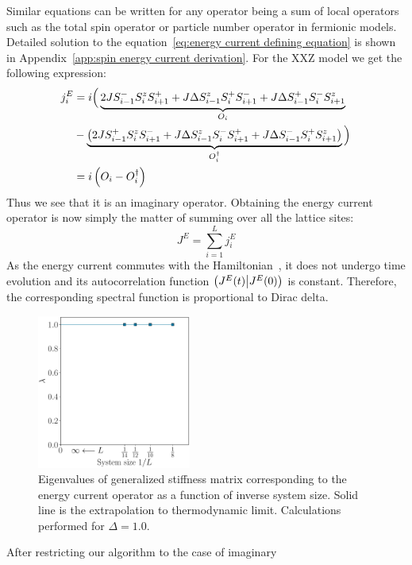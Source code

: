 Similar equations can be written for any operator being a sum of local operators such as
the total spin operator or particle number operator in fermionic models. Detailed solution to the equation~\eqref{eq:energy current defining equation}
is shown in Appendix~\ref{app:spin energy current derivation}. For the XXZ model we get the following expression:
\begin{align*}
  j_i^E & = i \Big( \underbrace{2J S^{-}_{i-1}S^{z}_i S^{+}_{i+1} + J \Delta S^{z}_{i-1}S^{+}_i S^{-}_{i+1} + J\Delta S^{+}_{i-1}S^{-}_iS^{z}_{i+1}}_{O_i}                                  \\
        & - \underbrace{\left(2J S^{+}_{i-1}S^{z}_i S^{-}_{i+1} + J\Delta S^{z}_{i-1}S^{-}_i S^{+}_{i+1} + J\Delta S^{-}_{i-1}S^{+}_{i} S^{z}_{i+1} \right)}_{O_i^{\dagger}}\Big) \nonumber \\
        & = i\left(O_i - O_i^{\dagger}\right)
\end{align*}
Thus we see that it is an imaginary operator.
Obtaining the energy current operator is now simply the matter of summing over all the lattice sites:
\begin{equation}
  J^E = \sum_{i=1}^L j_i^E
  \label{eq:energy current}
\end{equation}
As the energy current commutes with the Hamiltonian~\autocite{Zotos1997}, it does not undergo time evolution
and its autocorrelation function \(\left(J^E(t) \middle| J^E(0)\right)\) is constant. Therefore, the corresponding
spectral function is proportional to Dirac delta.
\begin{figure}[htbp]
  \centering
  \includegraphics[width=0.45\textwidth]{Figures/current_int.pdf}
  \caption{Eigenvalues of generalized stiffness matrix corresponding to the energy current
  operator as a function of inverse system size. Solid line is the extrapolation to thermodynamic
  limit. Calculations performed for \(\Delta=1.0\).}\label{fig: current integrable}
\end{figure}
After restricting our algorithm to the case of imaginary
